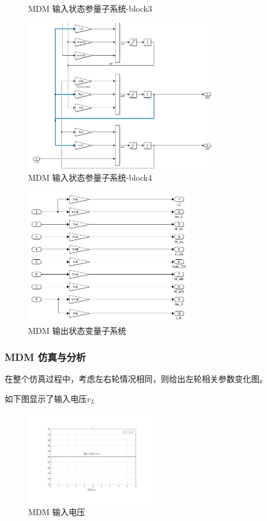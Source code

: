 \begin{itemize}
\begin{figure}[!h]
		\caption{MDM 输入状态参量子系统-block3}
	\end{figure}
	\begin{figure}[!h]
		\centering
		\includegraphics[width=0.75\textwidth]{fig/simulink/MDM_simulink_block4.png}
		\caption{MDM 输入状态参量子系统-block4}
	\end{figure}
	\begin{figure}[!t]
		\centering
		\includegraphics[width=0.65\textwidth]{fig/simulink/MDM_simulink_block5.png}
		\caption{MDM 输出状态变量子系统}
	\end{figure}
	
	\clearpage
	\subsubsection{MDM 仿真与分析}
	在整个仿真过程中，考虑左右轮情况相同，则给出左轮相关参数变化图。
	
	如下图显示了输入电压$ v_L $
	\begin{figure}[!h]
		\centering
		\includegraphics[width=0.52\textwidth]{fig/simulation/MDM_v_L.pdf}
		\caption{MDM 输入电压}\label{MDM_v_L}
	\end{figure}
	

\end{itemize}
